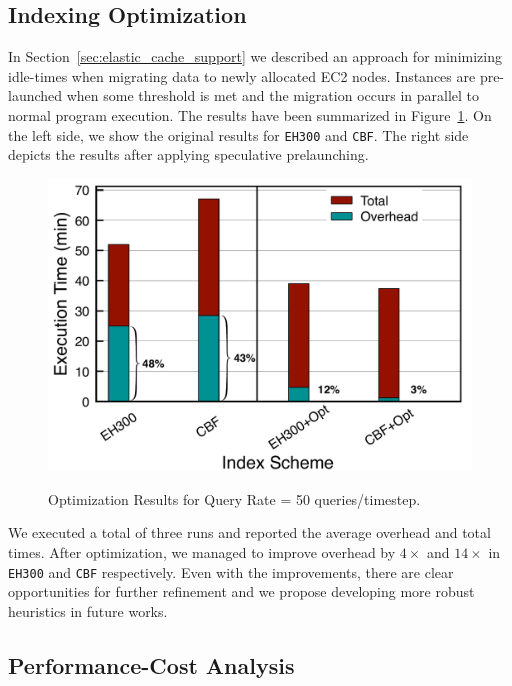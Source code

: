 
\subsection{Indexing Optimization} %
\label{sub:indexing_optimization}
In Section~\ref{sec:elastic_cache_support} we described an approach for
minimizing idle-times when migrating data to newly allocated EC2 nodes.
Instances are pre-launched when some threshold is met and the migration
occurs in parallel to normal program execution. The results have been
summarized in Figure~\ref{fig:opt_prelaunch}. On the left side, we show the original
results for {\tt EH300} and {\tt CBF}. The right side depicts the results after
applying speculative prelaunching.

\begin{figure}[htp]
\centering
 \includegraphics[scale=0.35]{figures/overhead-50.pdf} \\
\caption{\label{fig:opt_prelaunch}Optimization Results for Query Rate = 50
queries/timestep.}
\end{figure}

We executed a total of three runs and reported the average overhead and total
times. After optimization, we managed to improve overhead by $4\times$ and
$14\times$  in {\tt EH300} and {\tt CBF} respectively. Even with the
improvements, there are clear opportunities for further refinement and we
propose developing more robust heuristics in future works.


\subsection{Performance-Cost Analysis} %
\label{sub:performance_cost_analysis}

